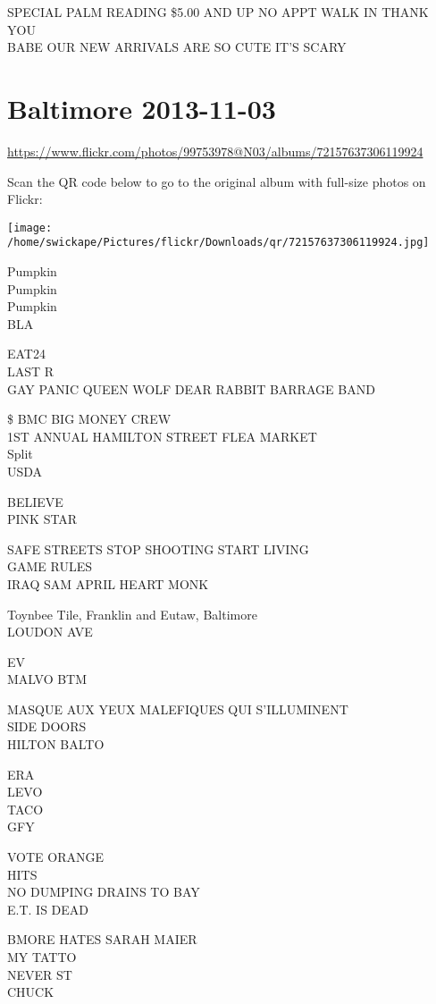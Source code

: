 \documentclass[10pt,letterpaper]{article}
\begin{document}
SPECIAL PALM READING \$5.00 AND UP NO APPT WALK IN THANK YOU\\
BABE OUR NEW ARRIVALS ARE SO CUTE IT'S SCARY
\pagebreak

\section*{Baltimore 2013-11-03}

\url{https://www.flickr.com/photos/99753978@N03/albums/72157637306119924}

Scan the QR code below to go to the original album with full-size photos on Flickr:

\texttt{[image: /home/swickape/Pictures/flickr/Downloads/qr/72157637306119924.jpg]}
\pagebreak

Pumpkin\\
Pumpkin\\
Pumpkin\\
BLA

EAT24\\
LAST R\\
GAY PANIC QUEEN WOLF DEAR RABBIT BARRAGE BAND

\$ BMC BIG MONEY CREW\\
1ST ANNUAL HAMILTON STREET FLEA MARKET\\
Split\\
USDA

BELIEVE\\
PINK STAR

SAFE STREETS STOP SHOOTING START LIVING\\
GAME RULES\\
IRAQ SAM APRIL HEART MONK

Toynbee Tile, Franklin and Eutaw, Baltimore\\
LOUDON AVE

EV\\
MALVO BTM

MASQUE AUX YEUX MALEFIQUES QUI S'ILLUMINENT\\
SIDE DOORS\\
HILTON BALTO

ERA\\
LEVO\\
TACO\\
GFY

VOTE ORANGE\\
HITS\\
NO DUMPING DRAINS TO BAY\\
E.T. IS DEAD

BMORE HATES SARAH MAIER\\
MY TATTO\\
NEVER ST\\
CHUCK
\end{document}
